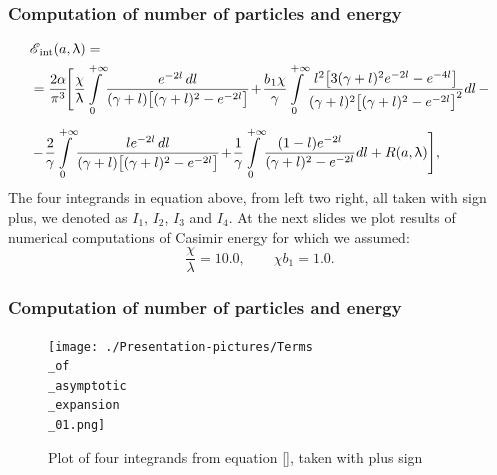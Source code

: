 \documentclass[10pt,t]{beamer}
\begin{document}
\begin{frame}
  \frametitle{Computation of number of particles and energy}

  \vspace{-2em}


  \begin{equation}
    \label{eq:Energia-Casimira-dla-rodziny-ETC-09}
    \begin{split}
      &\EInt( a, \lambda ) = \\
      &=
        \frac{ 2 \alpha }{ \pi^{ 3 } } \! \Bigg[ \frac{ \chi }{ \lambda } \!
        \int\limits_{ 0 }^{ +\infty } \!
        \frac{ e^{ -2 l } \, dl }{ ( \gamma + l )
        \big[ ( \gamma + l )^{ 2 } - e^{ -2 l } \big] } \! + \!
        \frac{ b_{ \HorSpaceOne 1 } \chi }{ \gamma } \!
        \int\limits_{ 0 }^{ +\infty } \!
        \frac{ l^{ 2 } \big[ 3 ( \gamma + l )^{ 2 } e^{ -2 l } -
        e^{ -4 l } \big] }
        { ( \gamma + l )^{ 2 }
        \big[ ( \gamma + l )^{ 2 } - e^{ -2 l } \big]^{ 2 } } dl
        \, - \\[0.5em]
      &- \! \frac{ 2 }{ \gamma } \! \int\limits_{ 0 }^{ +\infty } \!
        \frac{ l e^{ -2 l }\, dl }{ ( \gamma + l )
        \big[ ( \gamma + l )^{ 2 } - e^{ -2 l } \big] } \! + \!
        \frac{ 1 }{ \gamma } \!
        \int\limits_{ 0 }^{ +\infty } \! \frac{ ( 1 - l ) e^{ -2 l } }{
        ( \gamma + l )^{ 2 } - e^{ -2 l } } dl + R( a, \lambda ) \Bigg],
    \end{split}
  \end{equation}
  The four integrands in equation above, from left two right, all taken
  with sign plus, we denoted as $I_{ 1 }$, $I_{ 2 }$, $I_{ 3 }$ and $I_{ 4 }$.
  At the next slides we plot results of numerical computations of Casimir
  energy for which we assumed:
  \begin{equation}
    \frac{ \chi }{ \lambda } = 10.0, \qquad
    \chi b_{ 1 } = 1.0.
  \end{equation}

\end{frame}





\begin{frame}
  \frametitle{Computation of number of particles and energy}


  \begin{figure}

    \label{fig:aaa}

    \centering


    \texttt{[image: ./Presentation-pictures/Terms\\\_of\\\_asymptotic\\\_expansion\\\_01.png]}

    \caption{Plot of four integrands from equation \eqref{}, taken with
      plus sign}


  \end{figure}

\end{frame}
\end{document}
